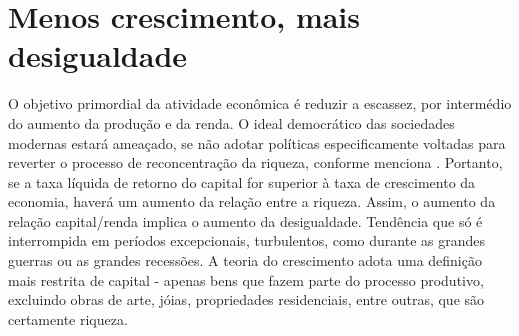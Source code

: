 \section{Menos crescimento, mais desigualdade}

O objetivo primordial da atividade econômica é reduzir a escassez, por intermédio do aumento da produção e da renda.
O ideal democrático das sociedades modernas estará ameaçado, se não adotar políticas especificamente voltadas para reverter o processo de reconcentração da riqueza, conforme menciona .
Portanto, se a taxa líquida de retorno do capital for superior à taxa de crescimento da economia, haverá um aumento da relação entre a riqueza.
Assim, o aumento da relação capital/renda implica o aumento da desigualdade. 
Tendência que só é interrompida em períodos excepcionais, turbulentos, como durante as grandes guerras ou as grandes recessões.
A teoria do crescimento adota uma definição mais restrita de capital - apenas bens que fazem parte do processo produtivo, excluindo obras de arte, jóias, propriedades residenciais, entre outras, que são certamente riqueza.
